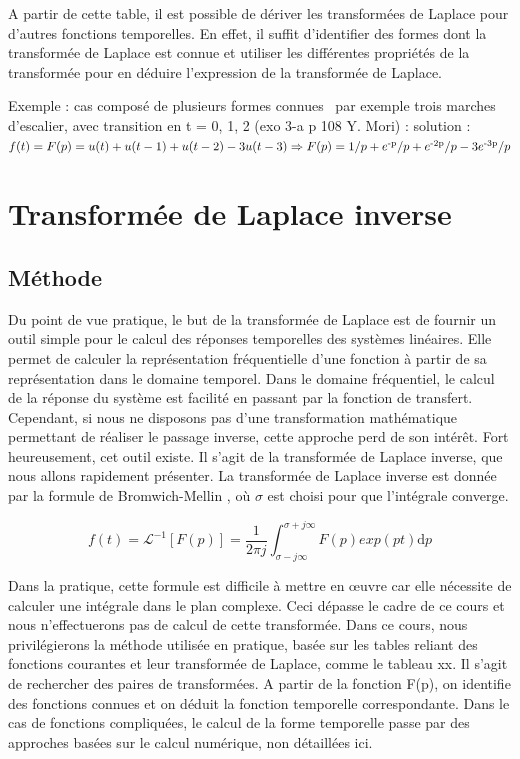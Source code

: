 \documentclass[]{report}
\newcommand{\deriv}{\mathrm{d}}
\begin{document}
	A partir de cette table, il est possible de dériver les transformées de Laplace pour d'autres fonctions temporelles. En effet, il suffit d'identifier des formes dont la transformée de Laplace est connue et utiliser les différentes propriétés de la transformée pour en déduire l'expression de la transformée de Laplace.
	
	Exemple : cas composé de plusieurs formes connues~ par exemple trois
	marches d'escalier, avec transition en t = 0, 1, 2 (exo 3-a p 108 Y.
	Mori) : solution : $f(t) = F(p) = u(t) + u(t-1) + u(t-2) - 3u(t-3) \Rightarrow F(p)
	=1/p+e\textsuperscript{-p}/p+e\textsuperscript{-2p}/p-3e\textsuperscript{-3p}/p$
	
	
	\section{Transformée de Laplace inverse}
	\subsection{Méthode}
	Du point de vue pratique, le but de la transformée de Laplace est de fournir un outil simple pour le calcul des réponses temporelles des systèmes linéaires. Elle permet de calculer la représentation fréquentielle d'une fonction à partir de sa représentation dans le domaine temporel. Dans le domaine fréquentiel, le calcul de la réponse du système est facilité en passant par la fonction de transfert. Cependant, si nous ne disposons pas d'une transformation mathématique permettant de réaliser le passage inverse, cette approche perd de son intérêt.  Fort heureusement, cet outil existe. Il s'agit de la transformée de Laplace inverse, que nous allons rapidement présenter. 
	La transformée de Laplace inverse est donnée par la formule de Bromwich-Mellin , où $\sigma$ est choisi pour que l'intégrale converge.
	
	\begin{equation}\label{TL_inverse}
	f(t) = \mathcal{L}^{-1}[F(p)]=\frac{1}{2\pi j}\int_{\sigma - j\infty}^{\sigma + j\infty}F(p)exp(pt) \deriv p
	\end{equation}
	
	Dans la pratique, cette formule est difficile à mettre en œuvre car elle nécessite de calculer une intégrale dans le plan complexe. Ceci dépasse le cadre de ce cours et nous n'effectuerons pas de calcul de cette transformée. Dans ce cours, nous privilégierons la méthode utilisée en pratique, basée sur les tables reliant des fonctions courantes et leur transformée de Laplace, comme le tableau xx. Il s'agit de rechercher des paires de transformées. A partir de la fonction F(p), on identifie des fonctions connues et on déduit la fonction temporelle correspondante. Dans le cas de fonctions compliquées, le calcul de la forme temporelle passe par des approches basées sur le calcul numérique, non détaillées ici.
	
\end{document}
